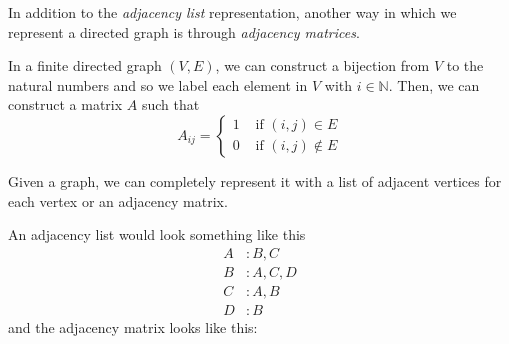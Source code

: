 \documentclass{article}
\begin{document}
    In addition to the \textit{adjacency list} representation, another way in which we represent a directed graph is through \textit{adjacency matrices}. 

    \begin{definition}
      In a finite directed graph $(V, E)$, we can construct a bijection from $V$ to the natural numbers and so we label each element in $V$ with $i \in \mathbb{N}$. Then, we can construct a matrix $A$ such that 
      \begin{equation}
        A_{ij} = \begin{cases} 1 & \text{ if } (i, j) \in E \\ 0 & \text{ if } (i, j) \not\in E \end{cases}
      \end{equation}
    \end{definition}

    \begin{example}
      Given a graph, we can completely represent it with a list of adjacent vertices for each vertex or an adjacency matrix. 
      \begin{center}
      \end{center}
      An adjacency list would look something like this 
      \[
      \begin{aligned}
      A &: B, C \\
      B &: A, C, D \\
      C &: A, B \\
      D &: B
      \end{aligned}
      \]
      and the adjacency matrix looks like this: 
      \begin{center}
      \end{center}
    \end{example}
\end{document}
